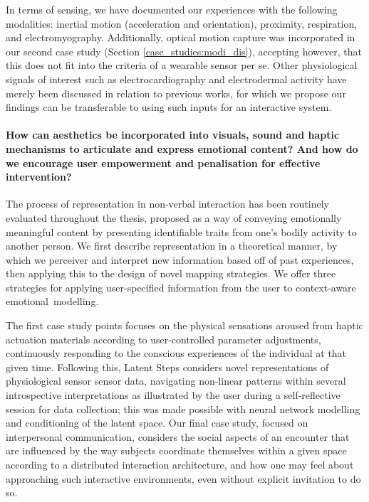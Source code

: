 In terms of sensing, we have documented our experiences with the following modalities: inertial motion (acceleration and orientation), proximity, respiration, and electromyography. Additionally, optical motion capture was incorporated in our second case study (Section \ref{case_studies:modi_dis}), accepting however, that this does not fit into the criteria of a wearable sensor per se. Other physiological signals of interest such as electrocardiography and electrodermal activity have merely been discussed in relation to previous works, for which we propose our findings can be transferable to using such inputs for an interactive system.

\paragraph{How can aesthetics be incorporated into visuals, sound and haptic mechanisms to articulate and express emotional content? And how do we encourage user empowerment and penalisation for effective intervention?}

The process of representation in non-verbal interaction has been routinely evaluated throughout the thesis, proposed as a way of conveying emotionally meaningful content by presenting identifiable traits from one's bodily activity to another person. We first describe representation in a theoretical manner, by which we perceiver and interpret new information based off of past experiences, then applying this to the design of novel mapping strategies. We offer three strategies for applying user-specified information from the user to context-aware emotional~modelling.

The first case study points focuses on the physical sensations aroused from haptic actuation materials according to user-controlled parameter adjustments, continuously responding to the conscious experiences of the individual at that given time. Following this, Latent Steps considers novel representations of physiological sensor sensor data, navigating non-linear patterns within several introspective interpretations as illustrated by the user during a self-reflective session for data collection; this was made possible with neural network modelling and conditioning of the latent space. Our final case study, focused on interpersonal communication, considers the social aspects of an encounter that are influenced by the way subjects coordinate themselves within a given space according to a distributed interaction architecture, and how one may feel about approaching such interactive environments, even without explicit invitation to do so.

